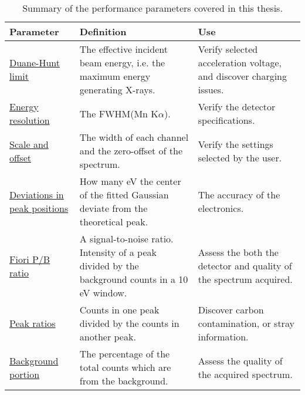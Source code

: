 \begin{table}[htp]
    \centering
    \caption{
        Summary of the performance parameters covered in this thesis.
    }
    \renewcommand*{\arraystretch}{1.4}
    \label{tab:eds_performance_parameters}
    \begin{tabular}{p{2.6cm}p{5cm}p{5cm}}
        \textbf{Parameter}                                                            & \textbf{Definition}                                                                              & \textbf{Use}                                                        \\
        \hline
        \hyperref[theory:eds_performance:duanehunt]{Duane-Hunt limit}                 & The effective incident beam energy, i.e. the maximum energy generating X-rays.                   & Verify selected acceleration voltage, and discover charging issues. \\
        \hyperref[theory:eds_performance:energyres]{Energy resolution}                & The FWHM(Mn K$\alpha$).                                                                          & Verify the detector specifications.                                 \\
        \hyperref[theory:eds_performance:scaleoffset]{Scale and offset}               & The width of each channel and the zero-offset of the spectrum.                                   & Verify the settings selected by the user.                           \\
        \hyperref[theory:eds_performance:peakpositions]{Deviations in peak positions} & How many eV the center of the fitted Gaussian deviate from the theoretical peak.                 & The accuracy of the electronics.                                    \\
        \hyperref[theory:eds_performance:fiori]{Fiori P/B ratio}                      & A signal-to-noise ratio. Intensity of a peak divided by the background counts in a 10 eV window. & Assess the both the detector and quality of the spectrum acquired.  \\
        \hyperref[theory:eds_performance:peakratio]{Peak ratios}                      & Counts in one peak divided by the counts in another peak.                                        & Discover carbon contamination, or stray information.                \\
        \hyperref[theory:eds_performance:bacgrkound_portion]{Background portion}      & The percentage of the total counts which are from the background.                                & Assess the quality of the acquired spectrum.
    \end{tabular}
\end{table}